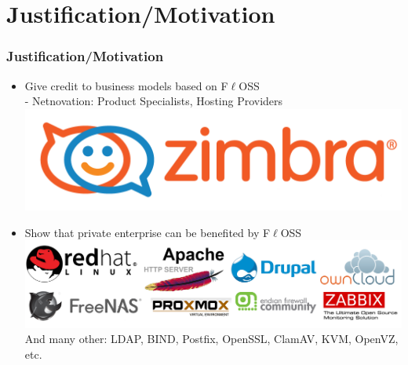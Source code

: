 \section{Justification/Motivation}

\begin{frame}
\frametitle{Justification/Motivation}

\begin{itemize}
  \item Give credit to business models based on F$\ell$OSS \\
  - Netnovation: Product Specialists, Hosting Providers \\
  \includegraphics[scale=0.1]{img/zimbra.png}
  
  \item Show that private enterprise can be benefited by F$\ell$OSS \\
  \includegraphics[scale=0.1]{img/multiple-logos.png} \\
  And many other: LDAP, BIND, Postfix, OpenSSL, ClamAV, KVM, OpenVZ, etc.
  
\end{itemize}
\end{frame}